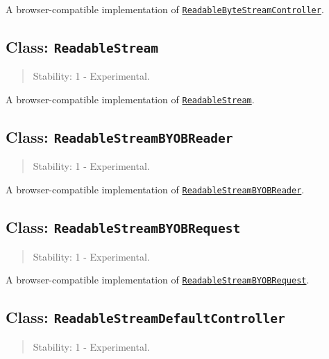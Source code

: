 A browser-compatible implementation of
\href{webstreams.md\#class-readablebytestreamcontroller}{\texttt{ReadableByteStreamController}}.

\subsection{\texorpdfstring{Class:
\texttt{ReadableStream}}{Class: ReadableStream}}\label{class-readablestream}

\begin{quote}
Stability: 1 - Experimental.
\end{quote}

A browser-compatible implementation of
\href{webstreams.md\#class-readablestream}{\texttt{ReadableStream}}.

\subsection{\texorpdfstring{Class:
\texttt{ReadableStreamBYOBReader}}{Class: ReadableStreamBYOBReader}}\label{class-readablestreambyobreader}

\begin{quote}
Stability: 1 - Experimental.
\end{quote}

A browser-compatible implementation of
\href{webstreams.md\#class-readablestreambyobreader}{\texttt{ReadableStreamBYOBReader}}.

\subsection{\texorpdfstring{Class:
\texttt{ReadableStreamBYOBRequest}}{Class: ReadableStreamBYOBRequest}}\label{class-readablestreambyobrequest}

\begin{quote}
Stability: 1 - Experimental.
\end{quote}

A browser-compatible implementation of
\href{webstreams.md\#class-readablestreambyobrequest}{\texttt{ReadableStreamBYOBRequest}}.

\subsection{\texorpdfstring{Class:
\texttt{ReadableStreamDefaultController}}{Class: ReadableStreamDefaultController}}\label{class-readablestreamdefaultcontroller}

\begin{quote}
Stability: 1 - Experimental.
\end{quote}

